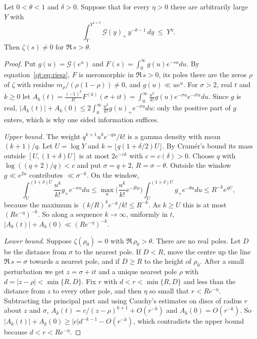 \begin{theorem}\label{lt:thm:intwin}
Let $0<\theta<1$ and $\delta>0$. Suppose that for every $\eta>0$ there are arbitrarily large $Y$ with
\[
\int_Y^{Y^{1+\delta}}\mathcal G(y)_+\,y^{-\theta-1}\,dy\ \le\ Y^\eta .
\]
Then $\zeta(s)\ne0$ for $\Re\,s>\theta$.
\end{theorem}

\begin{proof}
Put $g(u)=\mathcal G(e^u)$ and $F(s)=\int_0^\infty g(u)e^{-su}du$. By equation~\eqref{qt:eq:riesz}, $F$ is meromorphic in $\Re\,s>0$, its poles there are the zeros $\rho$ of $\zeta$ with residue $m_\rho/(\rho(1-\rho))\ne0$, and $g(u)\ll ue^{u}$. For $\sigma>2$, real $t$ and $k\ge0$ let $A_k(t)=\frac{(-1)^k}{k!}F^{(k)}(\sigma+it)=\int_0^\infty\frac{u^k}{k!}g(u)e^{-\sigma u}e^{-itu}du$. Since $g$ is real, $|A_k(t)|+A_k(0)\le2\int_0^\infty\frac{u^k}{k!}g(u)_+e^{-\sigma u}du$: only the positive part of $g$ enters, which is why one sided information suffices.

\emph{Upper bound.} The weight $q^{k+1}u^ke^{-qu}/k!$ is a gamma density with mean $(k+1)/q$. Let $U=\log Y$ and $k=\lfloor q(1+\delta/2)U\rfloor$. By Cram\'er's bound its mass outside $[U,(1+\delta)U]$ is at most $2e^{-ck}$ with $c=c(\delta)>0$. Choose $q$ with $\log((q+2)/q)<c$ and put $\sigma=q+2$, $R=\sigma-\theta$. Outside the window $g\ll e^{2u}$ contributes $\ll\sigma^{-k}$. On the window,
\[
\int_U^{(1+\delta)U}\frac{u^k}{k!}g_+e^{-\sigma u}du\le\max_u\Big(\frac{u^k}{k!}e^{-Ru}\Big)\int_U^{(1+\delta)U}g_+e^{-\theta u}du\le R^{-k}e^{\eta U},
\]
because the maximum is $(k/R)^ke^{-k}/k!\le R^{-k}$. As $k\ge U$ this is at most $(Re^{-\eta})^{-k}$. So along a sequence $k\to\infty$, uniformly in $t$, $|A_k(t)|+A_k(0)\ll(Re^{-\eta})^{-k}$.

\emph{Lower bound.} Suppose $\zeta(\rho_0)=0$ with $\Re\,\rho_0>\theta$. There are no real poles. Let $D$ be the distance from $\sigma$ to the nearest pole. If $D<R$, move the centre up the line $\Re\,s=\sigma$ towards a nearest pole, and if $D\ge R$ to the height of $\rho_0$. After a small perturbation we get $z=\sigma+it$ and a unique nearest pole $\rho$ with $d=|z-\rho|<\min\{R,D\}$. Fix $r$ with $d<r<\min\{R,D\}$ and less than the distance from $z$ to every other pole, and then $\eta$ so small that $r<Re^{-\eta}$. Subtracting the principal part and using Cauchy's estimates on discs of radius $r$ about $z$ and $\sigma$, $A_k(t)=c/(z-\rho)^{k+1}+O(r^{-k})$ and $A_k(0)=O(r^{-k})$. So $|A_k(t)|+A_k(0)\ge|c|d^{-k-1}-O(r^{-k})$, which contradicts the upper bound because $d<r<Re^{-\eta}$.
\end{proof}

